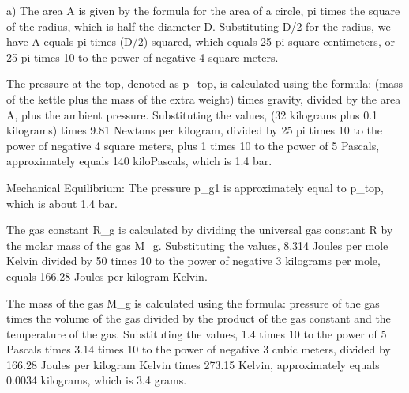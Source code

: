 a) The area A is given by the formula for the area of a circle, pi times the square of the radius, which is half the diameter D. Substituting D/2 for the radius, we have A equals pi times (D/2) squared, which equals 25 pi square centimeters, or 25 pi times 10 to the power of negative 4 square meters.

The pressure at the top, denoted as p_top, is calculated using the formula: (mass of the kettle plus the mass of the extra weight) times gravity, divided by the area A, plus the ambient pressure. Substituting the values, (32 kilograms plus 0.1 kilograms) times 9.81 Newtons per kilogram, divided by 25 pi times 10 to the power of negative 4 square meters, plus 1 times 10 to the power of 5 Pascals, approximately equals 140 kiloPascals, which is 1.4 bar.

Mechanical Equilibrium:
The pressure p_g1 is approximately equal to p_top, which is about 1.4 bar.

The gas constant R_g is calculated by dividing the universal gas constant R by the molar mass of the gas M_g. Substituting the values, 8.314 Joules per mole Kelvin divided by 50 times 10 to the power of negative 3 kilograms per mole, equals 166.28 Joules per kilogram Kelvin.

The mass of the gas M_g is calculated using the formula: pressure of the gas times the volume of the gas divided by the product of the gas constant and the temperature of the gas. Substituting the values, 1.4 times 10 to the power of 5 Pascals times 3.14 times 10 to the power of negative 3 cubic meters, divided by 166.28 Joules per kilogram Kelvin times 273.15 Kelvin, approximately equals 0.0034 kilograms, which is 3.4 grams.